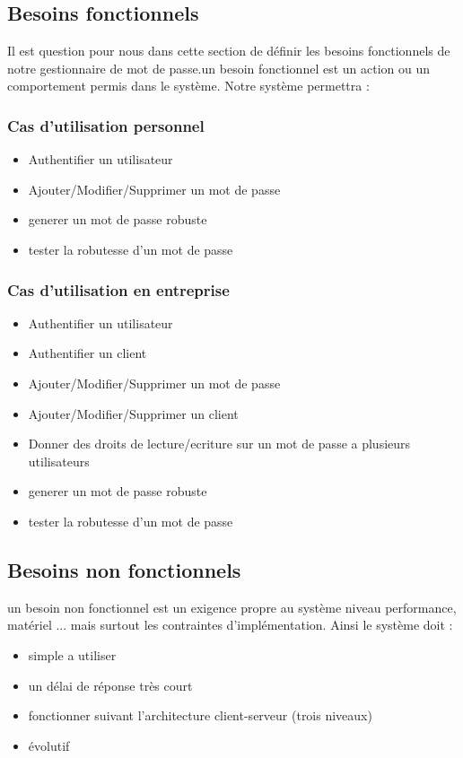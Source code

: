 \documentclass[11pt,a4paper]{report}
\begin{document}
 \subsection{Besoins fonctionnels}
 Il est question pour nous dans cette section de définir les besoins fonctionnels de notre gestionnaire de mot de passe.un besoin fonctionnel est un action ou un comportement permis dans le système. Notre système permettra :
 \subsubsection{Cas d'utilisation personnel}
 \begin{itemize}
 \item Authentifier un utilisateur
 \item Ajouter/Modifier/Supprimer un mot de passe
 \item generer un mot de passe robuste
 \item tester la robutesse d'un mot de passe
 \end{itemize}
 
 \subsubsection{Cas d'utilisation en entreprise}
 \begin{itemize}
 \item Authentifier un utilisateur
 \item Authentifier un client
 \item Ajouter/Modifier/Supprimer un mot de passe
 \item Ajouter/Modifier/Supprimer un client
 \item Donner des droits de lecture/ecriture sur un mot de passe a plusieurs utilisateurs
 \item generer un mot de passe robuste
 \item tester la robutesse d'un mot de passe
 \end{itemize}
 
 \subsection{Besoins non fonctionnels}
 un besoin non fonctionnel est un exigence propre au système niveau performance, matériel ... mais surtout les contraintes d'implémentation. Ainsi le système doit :
 \begin{itemize}
 \item simple a utiliser
 \item un délai de réponse très court
 \item fonctionner suivant l'architecture client-serveur (trois niveaux) 
 \item évolutif
 \end{itemize}
\end{document}
